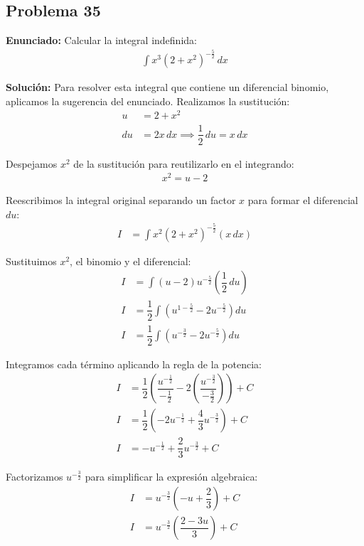 \subsection*{Problema 35}

\textbf{Enunciado:}
Calcular la integral indefinida:
\begin{align*}
\int x^{3} \left(2 + x^{2}\right)^{-\frac{5}{2}} \, dx
\end{align*}

\textbf{Solución:}
Para resolver esta integral que contiene un diferencial binomio, aplicamos la sugerencia del enunciado. Realizamos la sustitución:
\begin{align*}
u &= 2 + x^{2} \\
du &= 2x \, dx \implies \dfrac{1}{2} \, du = x \, dx
\end{align*}

Despejamos $x^{2}$ de la sustitución para reutilizarlo en el integrando:
\begin{align*}
x^{2} = u - 2
\end{align*}

Reescribimos la integral original separando un factor $x$ para formar el diferencial $du$:
\begin{align*}
I &= \int x^{2} \left(2 + x^{2}\right)^{-\frac{5}{2}} (x \, dx)
\end{align*}

Sustituimos $x^{2}$, el binomio y el diferencial:
\begin{align*}
I &= \int (u - 2) u^{-\frac{5}{2}} \left(\dfrac{1}{2} \, du\right) \\
I &= \dfrac{1}{2} \int \left( u^{1 - \frac{5}{2}} - 2 u^{-\frac{5}{2}} \right) du \\
I &= \dfrac{1}{2} \int \left( u^{-\frac{3}{2}} - 2 u^{-\frac{5}{2}} \right) du
\end{align*}

Integramos cada término aplicando la regla de la potencia:
\begin{align*}
I &= \dfrac{1}{2} \left( \dfrac{u^{-\frac{1}{2}}}{-\frac{1}{2}} - 2 \left( \dfrac{u^{-\frac{3}{2}}}{-\frac{3}{2}} \right) \right) + C \\
I &= \dfrac{1}{2} \left( -2u^{-\frac{1}{2}} + \dfrac{4}{3}u^{-\frac{3}{2}} \right) + C \\
I &= -u^{-\frac{1}{2}} + \dfrac{2}{3}u^{-\frac{3}{2}} + C
\end{align*}

Factorizamos $u^{-\frac{3}{2}}$ para simplificar la expresión algebraica:
\begin{align*}
I &= u^{-\frac{3}{2}} \left( -u + \dfrac{2}{3} \right) + C \\
I &= u^{-\frac{3}{2}} \left( \dfrac{2 - 3u}{3} \right) + C
\end{align*}

